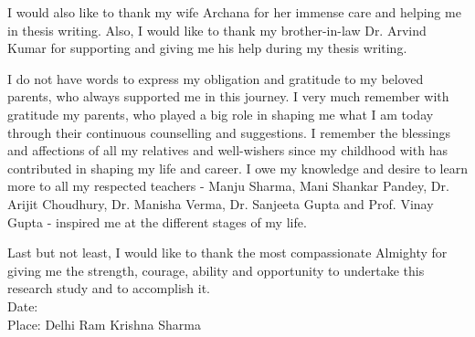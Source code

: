 I would also like to thank my wife Archana for her immense care and helping me in thesis writing. Also, I would like to thank my brother-in-law Dr. Arvind Kumar for supporting and giving me his help during my thesis writing.

I do not have words to express my obligation and gratitude to my beloved parents, who always supported me in this journey. I very much remember with gratitude my parents, who played a big role in shaping me what I am today through their continuous counselling and suggestions. I remember the blessings and affections of all my relatives and well-wishers since my childhood with has contributed in shaping my life and career. I owe my knowledge and desire to learn more to all my respected teachers - Manju Sharma, Mani Shankar Pandey, Dr. Arijit Choudhury, Dr. Manisha Verma, Dr. Sanjeeta Gupta and Prof. Vinay Gupta - inspired me at the different stages of my life.

Last but not least, I would like to thank the most compassionate Almighty for giving me the strength, courage, ability and opportunity to undertake this research study and to accomplish it.\\[3.0cm]
Date:\\
Place: Delhi \hfill Ram Krishna Sharma
